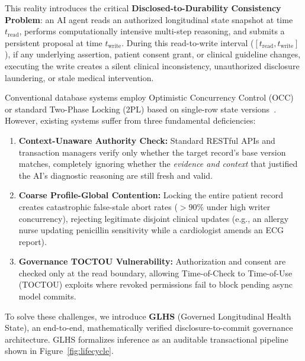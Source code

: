 \documentclass[11pt,a4paper]{article}
\begin{document}
This reality introduces the critical \textbf{Disclosed-to-Durability Consistency Problem}: an AI agent reads an authorized longitudinal state snapshot at time $t_{\text{read}}$, performs computationally intensive multi-step reasoning, and submits a persistent proposal at time $t_{\text{write}}$. During this read-to-write interval ($[t_{\text{read}}, t_{\text{write}}]$), if any underlying assertion, patient consent grant, or clinical guideline changes, executing the write creates a silent clinical inconsistency, unauthorized disclosure laundering, or stale medical intervention.

Conventional database systems employ Optimistic Concurrency Control (OCC) or standard Two-Phase Locking (2PL) based on single-row state versions~\cite{kumar1998,statefulgov}. However, existing systems suffer from three fundamental deficiencies:
\begin{enumerate}[leftmargin=1.8em]
  \item \textbf{Context-Unaware Authority Check:} Standard RESTful APIs and transaction managers verify only whether the target record's base version matches, completely ignoring whether the \emph{evidence and context} that justified the AI's diagnostic reasoning are still fresh and valid.
  \item \textbf{Coarse Profile-Global Contention:} Locking the entire patient record creates catastrophic false-stale abort rates ($>90\%$ under high writer concurrency), rejecting legitimate disjoint clinical updates (e.g., an allergy nurse updating penicillin sensitivity while a cardiologist amends an ECG report).
  \item \textbf{Governance TOCTOU Vulnerability:} Authorization and consent are checked only at the read boundary, allowing Time-of-Check to Time-of-Use (TOCTOU) exploits where revoked permissions fail to block pending async model commits.
\end{enumerate}

To solve these challenges, we introduce \textbf{GLHS} (Governed Longitudinal Health State), an end-to-end, mathematically verified disclosure-to-commit governance architecture. GLHS formalizes inference as an auditable transactional pipeline shown in Figure~\ref{fig:lifecycle}.
\end{document}

